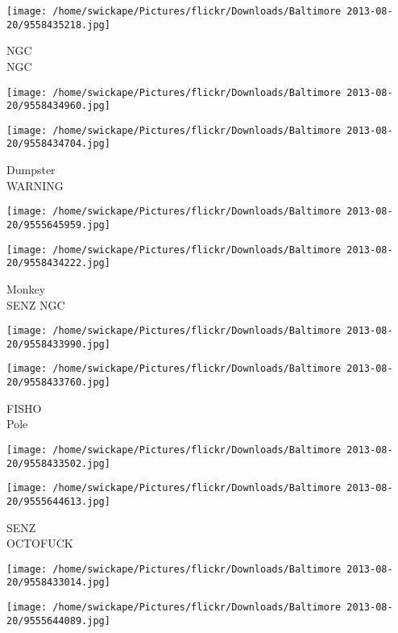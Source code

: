 \documentclass[10pt,letterpaper]{article}
\begin{document}
\vspace{0.25in}
\texttt{[image: /home/swickape/Pictures/flickr/Downloads/Baltimore 2013-08-20/9558435218.jpg]}

NGC\\
NGC\\
\pagebreak

\texttt{[image: /home/swickape/Pictures/flickr/Downloads/Baltimore 2013-08-20/9558434960.jpg]}

\vspace{0.25in}
\texttt{[image: /home/swickape/Pictures/flickr/Downloads/Baltimore 2013-08-20/9558434704.jpg]}

Dumpster\\
WARNING\\
\pagebreak

\texttt{[image: /home/swickape/Pictures/flickr/Downloads/Baltimore 2013-08-20/9555645959.jpg]}

\vspace{0.25in}
\texttt{[image: /home/swickape/Pictures/flickr/Downloads/Baltimore 2013-08-20/9558434222.jpg]}

Monkey\\
SENZ NGC\\
\pagebreak

\texttt{[image: /home/swickape/Pictures/flickr/Downloads/Baltimore 2013-08-20/9558433990.jpg]}

\vspace{0.25in}
\texttt{[image: /home/swickape/Pictures/flickr/Downloads/Baltimore 2013-08-20/9558433760.jpg]}

FISHO\\
Pole\\
\pagebreak

\texttt{[image: /home/swickape/Pictures/flickr/Downloads/Baltimore 2013-08-20/9558433502.jpg]}

\vspace{0.25in}
\texttt{[image: /home/swickape/Pictures/flickr/Downloads/Baltimore 2013-08-20/9555644613.jpg]}

SENZ\\
OCTOFUCK\\
\pagebreak

\texttt{[image: /home/swickape/Pictures/flickr/Downloads/Baltimore 2013-08-20/9558433014.jpg]}

\vspace{0.25in}
\texttt{[image: /home/swickape/Pictures/flickr/Downloads/Baltimore 2013-08-20/9555644089.jpg]}
\end{document}
